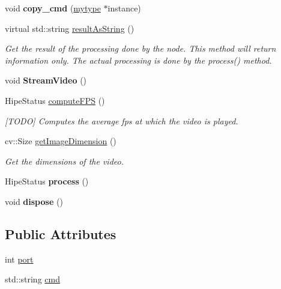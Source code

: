 \begin{DoxyCompactItemize}
void {\bfseries copy\+\_\+cmd} (\hyperlink{classfilter_1_1algos_1_1_stream_result_filter}{mytype} $\ast$instance)
\item 
virtual std\+::string \hyperlink{classfilter_1_1algos_1_1_stream_result_filter_acdd774d7dc6a7b807d5fc0bfe3343949}{result\+As\+String} ()
\begin{DoxyCompactList}\small\item\em Get the result of the processing done by the node. This method will return information only. The actual processing is done by the process() method. \end{DoxyCompactList}\item 
\mbox{\label{classfilter_1_1algos_1_1_stream_result_filter_ab2ad36f35208502d023ffdd40fd90b55}} 
void {\bfseries Stream\+Video} ()
\item 
Hipe\+Status \hyperlink{classfilter_1_1algos_1_1_stream_result_filter_a27d29967cd4ee806da63e5a6601bd28c}{compute\+F\+PS} ()
\begin{DoxyCompactList}\small\item\em \mbox{[}T\+O\+DO\mbox{]} Computes the average fps at which the video is played. \end{DoxyCompactList}\item 
cv\+::\+Size \hyperlink{classfilter_1_1algos_1_1_stream_result_filter_a16a4cab1c4c96cd69bcb381674618f33}{get\+Image\+Dimension} ()
\begin{DoxyCompactList}\small\item\em Get the dimensions of the video. \end{DoxyCompactList}\item 
\mbox{\label{classfilter_1_1algos_1_1_stream_result_filter_a28412cc84a19feeeef9eef5a92cc89eb}} 
Hipe\+Status {\bfseries process} ()
\item 
\mbox{\label{classfilter_1_1algos_1_1_stream_result_filter_a5e53792dee94cc8b8ac3b7ae74df7e60}} 
void {\bfseries dispose} ()
\end{DoxyCompactItemize}
\subsection*{Public Attributes}
\begin{DoxyCompactItemize}
\item 
int \hyperlink{classfilter_1_1algos_1_1_stream_result_filter_aa04a6b95545ed560dc51892ee87fb0ae}{port}
\item 
std\+::string \hyperlink{classfilter_1_1algos_1_1_stream_result_filter_a4c5d13897dc30f58b87381090f5249b3}{cmd}
\end{DoxyCompactItemize}
